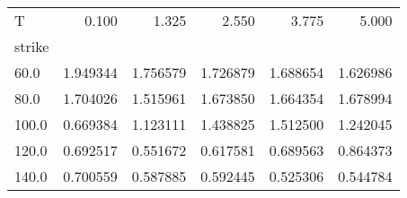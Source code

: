 \begin{tabular}{lrrrrr}
\toprule
T &     0.100 &     1.325 &     2.550 &     3.775 &     5.000 \\
strike &           &           &           &           &           \\
\midrule
60.0   &  1.949344 &  1.756579 &  1.726879 &  1.688654 &  1.626986 \\
80.0   &  1.704026 &  1.515961 &  1.673850 &  1.664354 &  1.678994 \\
100.0  &  0.669384 &  1.123111 &  1.438825 &  1.512500 &  1.242045 \\
120.0  &  0.692517 &  0.551672 &  0.617581 &  0.689563 &  0.864373 \\
140.0  &  0.700559 &  0.587885 &  0.592445 &  0.525306 &  0.544784 \\
\bottomrule
\end{tabular}
